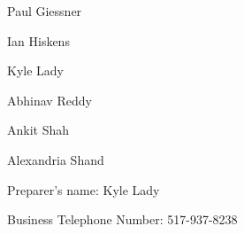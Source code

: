 \documentclass[incorporation,proposal,withoutpreface,withoutoptional,11pt,final]{bylaws}
\begin{document}
\vspace{0.5in}
\noindent Paul Giessner

\vspace{0.5in}
\noindent Ian Hiskens

\vspace{0.5in}
\noindent Kyle Lady

\vspace{0.5in}
\noindent Abhinav Reddy

\vspace{0.5in}
\noindent Ankit Shah

\vspace{0.5in}
\noindent Alexandria Shand


\vspace{0.75in}
\noindent Preparer's name: Kyle Lady

\noindent Business Telephone Number: 517-937-8238
\end{document}
